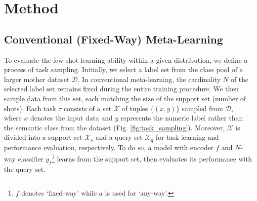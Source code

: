\documentclass[letterpaper]{article} %
\newcommand{\jh}[1]{\textcolor{black}{#1}}
\newcommand{\yr}[1]{\textcolor{black}{#1}}
\begin{document}
\section{Method}
\subsection{Conventional (Fixed-Way) Meta-Learning}

To evaluate the few-shot learning ability within a given distribution, we define a process of task sampling. Initially, 
we select a label set from the class pool of a larger mother dataset  $\mathcal{D}$. In conventional meta-learning, the cardinality $N$ of the selected label set remains
fixed during the entire training procedure. We then sample data from this set, each matching the size of the support set (number of shots).
Each task $\tau$ consists of a set $\mathcal{X}$ of tuples $\{(x, y)\}$ sampled from $\mathcal{D}$, where $x$ denotes the input data and $y$ represents the numeric label rather than the semantic class from the dataset (Fig. \ref{fig:task_sampling}).  Moreover, $\mathcal{X}$ is divided into a support set $\mathcal{X}_s$ and a query set $\mathcal{X}_q$ for task learning and performance evaluation, respectively. %
To do so, a model with encoder $f$ and $N$-way classifier $g_{f}$\footnote{$f$ denotes `fixed-way' while $a$ is used for `any-way'. } learns from the support set, then evaluates its performance with the query set.
\end{document}

